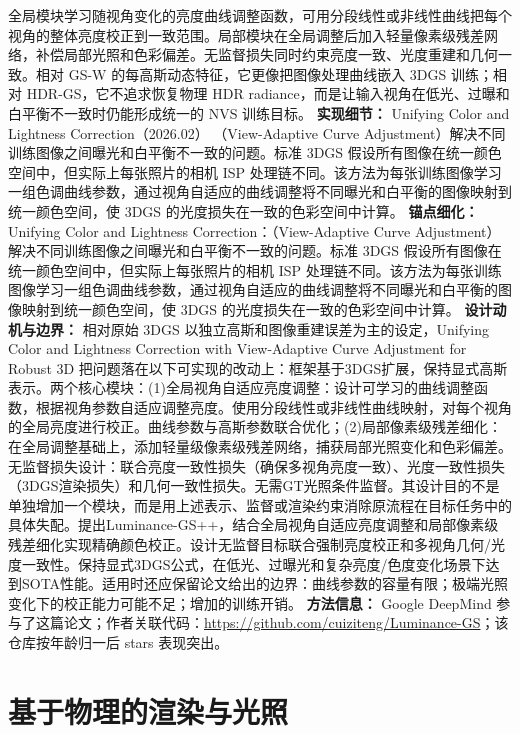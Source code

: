 全局模块学习随视角变化的亮度曲线调整函数，可用分段线性或非线性曲线把每个视角的整体亮度校正到一致范围。局部模块在全局调整后加入轻量像素级残差网络，补偿局部光照和色彩偏差。无监督损失同时约束亮度一致、光度重建和几何一致。相对 GS-W 的每高斯动态特征，它更像把图像处理曲线嵌入 3DGS 训练；相对 HDR-GS，它不追求恢复物理 HDR radiance，而是让输入视角在低光、过曝和白平衡不一致时仍能形成统一的 NVS 训练目标。
\textbf{实现细节：} Unifying Color and Lightness Correction（2026.02） （View-Adaptive Curve Adjustment）解决不同训练图像之间曝光和白平衡不一致的问题。标准 3DGS 假设所有图像在统一颜色空间中，但实际上每张照片的相机 ISP 处理链不同。该方法为每张训练图像学习一组色调曲线参数，通过视角自适应的曲线调整将不同曝光和白平衡的图像映射到统一颜色空间，使 3DGS 的光度损失在一致的色彩空间中计算。
\textbf{锚点细化：} Unifying Color and Lightness Correction：（View-Adaptive Curve Adjustment）解决不同训练图像之间曝光和白平衡不一致的问题。标准 3DGS 假设所有图像在统一颜色空间中，但实际上每张照片的相机 ISP 处理链不同。该方法为每张训练图像学习一组色调曲线参数，通过视角自适应的曲线调整将不同曝光和白平衡的图像映射到统一颜色空间，使 3DGS 的光度损失在一致的色彩空间中计算。
\textbf{设计动机与边界：} 相对原始 3DGS 以独立高斯和图像重建误差为主的设定，Unifying Color and Lightness Correction with View-Adaptive Curve Adjustment for Robust 3D  把问题落在以下可实现的改动上：框架基于3DGS扩展，保持显式高斯表示。两个核心模块：(1)全局视角自适应亮度调整：设计可学习的曲线调整函数，根据视角参数自适应调整亮度。使用分段线性或非线性曲线映射，对每个视角的全局亮度进行校正。曲线参数与高斯参数联合优化；(2)局部像素级残差细化：在全局调整基础上，添加轻量级像素级残差网络，捕获局部光照变化和色彩偏差。无监督损失设计：联合亮度一致性损失（确保多视角亮度一致）、光度一致性损失（3DGS渲染损失）和几何一致性损失。无需GT光照条件监督。其设计目的不是单独增加一个模块，而是用上述表示、监督或渲染约束消除原流程在目标任务中的具体失配。提出Luminance-GS++，结合全局视角自适应亮度调整和局部像素级残差细化实现精确颜色校正。设计无监督目标联合强制亮度校正和多视角几何/光度一致性。保持显式3DGS公式，在低光、过曝光和复杂亮度/色度变化场景下达到SOTA性能。适用时还应保留论文给出的边界：曲线参数的容量有限；极端光照变化下的校正能力可能不足；增加的训练开销。
\textbf{方法信息：} Google DeepMind 参与了这篇论文；作者关联代码：\url{https://github.com/cuiziteng/Luminance-GS}；该仓库按年龄归一后 stars 表现突出。



\section{基于物理的渲染与光照}

